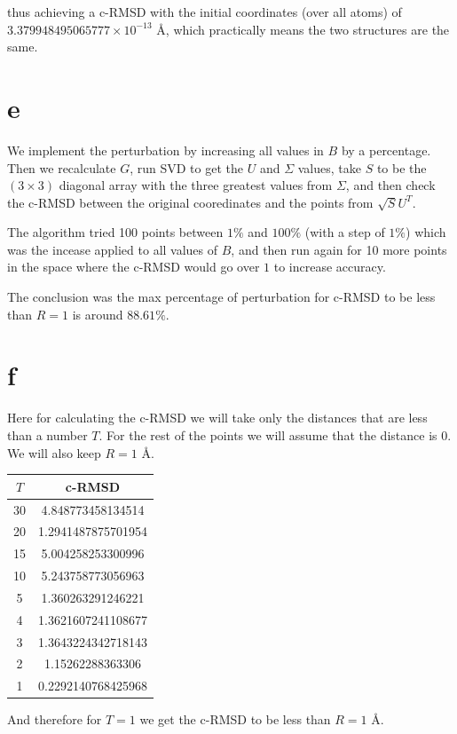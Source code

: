 \documentclass[a4paper,11pt]{article}
\begin{document}
thus achieving a c-RMSD with the initial coordinates (over all atoms) of $3.379948495065777 \times 10^{-13}$ \AA, which practically means the two structures are the same.

\vspace{5mm}


\section*{e}

We implement the perturbation by increasing all values in $B$ by a percentage.
Then we recalculate $G$, run SVD to get the $U$ and $\Sigma$ values, take $S$ to be the $(3 \times 3)$ diagonal array with the three greatest values from $\Sigma$, and then check the c-RMSD between the original cooredinates and the points from $\sqrt{S}U^T$.

The algorithm tried 100 points between $1\%$ and $100\%$ (with a step of $1\%$) which was the incease applied to all values of $B$, and then run again for 10 more points in the space where the c-RMSD would go over $1$ to increase accuracy.

The conclusion was the max percentage of perturbation for c-RMSD to be less than $R = 1$ is around $88.61\%$.

\section*{f}

Here for calculating the c-RMSD we will take only the distances that are less than a number $T$.
For the rest of the points we will assume that the distance is $0$.
We will also keep $R = 1$ \AA.

\begin{center}
  \begin{tabular}{ ||c|c|| }
    \hline
    $T$ & c-RMSD\\
    \hline \hline
    30 & 4.848773458134514\\
    20 & 1.2941487875701954\\
    15 & 5.004258253300996\\
    10 & 5.243758773056963\\
    5 & 1.360263291246221\\
    4 & 1.3621607241108677\\
    3 & 1.3643224342718143\\
    2 & 1.15262288363306\\
    1 & 0.2292140768425968\\
    \hline
  \end{tabular}
\end{center}

And therefore for $T = 1$ we get the c-RMSD to be less than $R = 1$ \AA.
\end{document}
